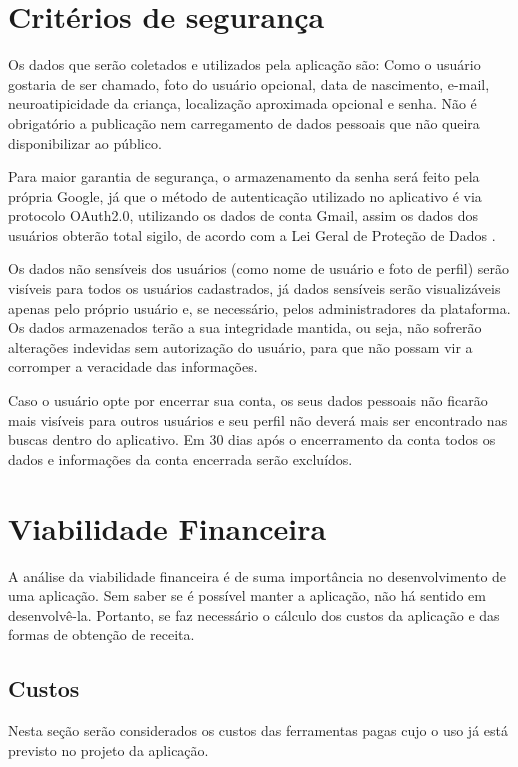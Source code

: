 \section{Critérios de segurança}


 Os dados que serão coletados e utilizados pela aplicação são: Como o usuário gostaria de ser chamado, foto do usuário opcional, data de nascimento, e-mail, neuroatipicidade da criança, localização aproximada opcional e senha. Não é obrigatório a publicação nem carregamento de dados pessoais que não queira disponibilizar ao público.

Para maior garantia de segurança, o armazenamento da senha será feito pela própria Google, já que o método de autenticação utilizado no aplicativo é via protocolo OAuth2.0, utilizando os dados de conta Gmail, assim os dados dos usuários obterão total sigilo, de acordo com a Lei Geral de Proteção de Dados \cite{googleprivacy}. 

Os dados não sensíveis dos usuários (como nome de usuário e foto de perfil) serão visíveis para todos os usuários cadastrados, já dados sensíveis serão visualizáveis apenas pelo próprio usuário e, se necessário, pelos administradores da plataforma. Os dados armazenados terão a sua integridade mantida, ou seja, não sofrerão alterações indevidas sem autorização do usuário, para que não possam vir a corromper a veracidade das informações. 

Caso o usuário opte por encerrar sua conta, os seus dados pessoais não ficarão mais visíveis para outros usuários e seu perfil não deverá mais ser encontrado nas buscas dentro do aplicativo. Em 30 dias após o encerramento da conta todos os dados e informações da conta encerrada serão excluídos. 

\section{Viabilidade Financeira}

A análise da viabilidade financeira é de suma importância no desenvolvimento de uma aplicação. Sem saber se é possível manter a aplicação, não há sentido em desenvolvê-la. Portanto, se faz necessário o cálculo dos custos da aplicação e das formas de obtenção de receita.

\subsection{Custos}
Nesta seção serão considerados os custos das ferramentas pagas cujo o uso já está previsto no projeto da aplicação. 

